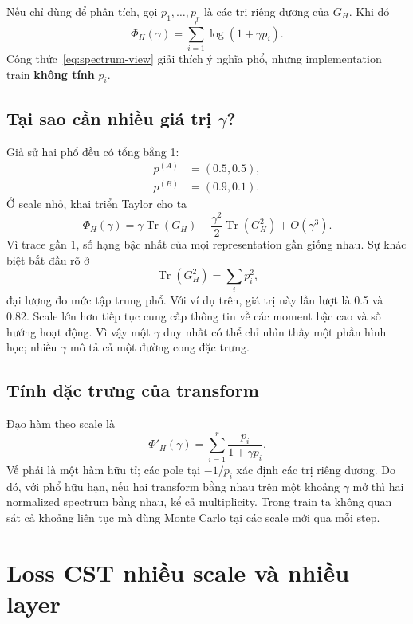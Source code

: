 \documentclass{article}
\newcommand{\cst}{\textsc{CST}}
\begin{document}
Nếu chỉ dùng để phân tích, gọi $p_1,\ldots,p_r$ là các trị riêng dương của
$G_H$.  Khi đó
\begin{equation}
 \Phi_H(\gamma)=\sum_{i=1}^{r}\log(1+\gamma p_i).
 \label{eq:spectrum-view}
\end{equation}
Công thức~\ref{eq:spectrum-view} giải thích ý nghĩa phổ, nhưng implementation
train \textbf{không tính} $p_i$.

\subsection{Tại sao cần nhiều giá trị $\gamma$?}

Giả sử hai phổ đều có tổng bằng 1:
\begin{align}
 p^{(A)}&=(0.5,0.5),\\
 p^{(B)}&=(0.9,0.1).
\end{align}
Ở scale nhỏ, khai triển Taylor cho ta
\begin{equation}
 \Phi_H(\gamma)
 =\gamma\operatorname{Tr}(G_H)
 -\frac{\gamma^2}{2}\operatorname{Tr}(G_H^2)
 +O(\gamma^3).
 \label{eq:taylor}
\end{equation}
Vì trace gần 1, số hạng bậc nhất của mọi representation gần giống nhau.  Sự
khác biệt bắt đầu rõ ở
\begin{equation}
 \operatorname{Tr}(G_H^2)=\sum_i p_i^2,
\end{equation}
đại lượng đo mức tập trung phổ.  Với ví dụ trên, giá trị này lần lượt là 0.5 và
0.82.  Scale lớn hơn tiếp tục cung cấp thông tin về các moment bậc cao và số
hướng hoạt động.  Vì vậy một $\gamma$ duy nhất có thể chỉ nhìn thấy một phần
hình học; nhiều $\gamma$ mô tả cả một đường cong đặc trưng.

\subsection{Tính đặc trưng của transform}

Đạo hàm theo scale là
\begin{equation}
 \Phi'_H(\gamma)=\sum_{i=1}^{r}\frac{p_i}{1+\gamma p_i}.
 \label{eq:derivative}
\end{equation}
Vế phải là một hàm hữu tỉ; các pole tại $-1/p_i$ xác định các trị riêng dương.
Do đó, với phổ hữu hạn, nếu hai transform bằng nhau trên một khoảng $\gamma$
mở thì hai normalized spectrum bằng nhau, kể cả multiplicity.  Trong train ta
không quan sát cả khoảng liên tục mà dùng Monte Carlo tại các scale mới qua mỗi
step.

\section{Loss \cst{} nhiều scale và nhiều layer}
\end{document}
